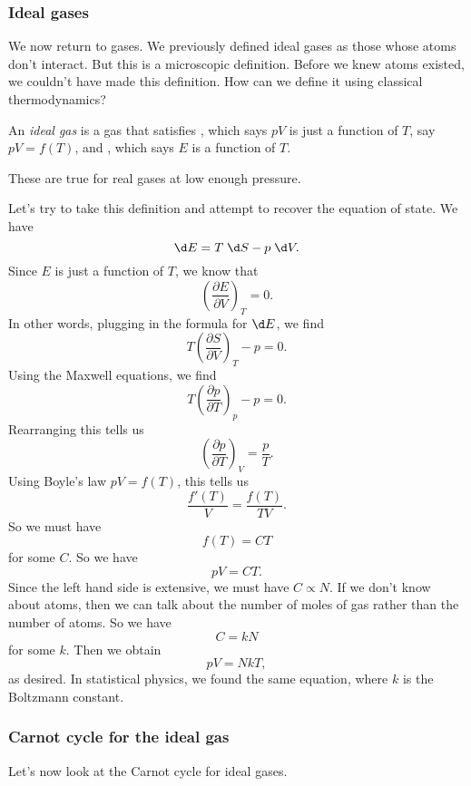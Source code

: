 \documentclass[a4paper]{article}
\begin{document}
\subsubsection*{Ideal gases}
We now return to gases. We previously defined ideal gases as those whose atoms don't interact. But this is a microscopic definition. Before we knew atoms existed, we couldn't have made this definition. How can we define it using classical thermodynamics?

\begin{defi}
  An \emph{ideal gas} is a gas that satisfies , which says $pV$ is just a function of $T$, say $pV = f(T)$, and , which says $E$ is a function of $T$.
\end{defi}
These are true for real gases at low enough pressure.

Let's try to take this definition and attempt to recover the equation of state. We have
\[
  \d E = T\;\d S - p \;\d V.
\]
Since $E$ is just a function of $T$, we know that
\[
  \left(\frac{\partial E}{\partial V}\right)_T = 0.
\]
In other words, plugging in the formula for $\d E$, we find
\[
  T\left(\frac{\partial S}{\partial V}\right)_T - p = 0.
\]
Using the Maxwell equations, we find
\[
  T\left(\frac{\partial p}{\partial T}\right)_p - p = 0.
\]
Rearranging this tells us
\[
  \left(\frac{\partial p}{\partial T}\right)_V = \frac{p}{T}.
\]
Using Boyle's law $pV = f(T)$, this tells us
\[
  \frac{f'(T)}{V} = \frac{f(T)}{TV}.
\]
So we must have
\[
  f(T) = CT
\]
for some $C$. So we have
\[
  pV = CT.
\]
Since the left hand side is extensive, we must have $C \propto N$. If we don't know about atoms, then we can talk about the number of moles of gas rather than the number of atoms. So we have
\[
  C = kN
\]
for some $k$. Then we obtain
\[
  pV = NkT,
\]
as desired. In statistical physics, we found the same equation, where $k$ is the Boltzmann constant.

\subsubsection*{Carnot cycle for the ideal gas}
Let's now look at the Carnot cycle for ideal gases.
\end{document}
